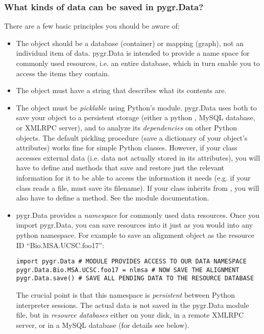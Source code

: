 \documentclass{howto}
\begin{document}
\subsubsection{What kinds of data can be saved in pygr.Data?}
There are a few basic principles you should be aware of:
\begin{itemize}
\item The object should be a database (container) or mapping (graph),
not an individual item of data.  pygr.Data is intended to provide
a name space for commonly used resources, i.e. an entire database,
which in turn enable you to access the items they contain.

\item The object must have a  string that describes
what its contents are.

\item The object must be {\em picklable} using Python's 
module.  pygr.Data uses  both to save your object to 
a persistent storage (either a python , MySQL database,
or XMLRPC server), and to analyze its {\em dependencies} on other
Python objects.  The default pickling procedure (save a dictionary of
your object's attributes) works fine for simple Python classes.
However, if your class accesses external data (i.e. data not actually
stored in its attributes), you will have to define 
and  methods that save and restore just the 
relevant information for it to be able to access the information
it needs (e.g. if your class reads a file,  must
save its filename).  If your class inherits from , you
will also have to define a  method.  See 
the  module documentation.

\item pygr.Data provides a {\em namespace} for commonly used data resources.
Once you import pygr.Data, you can save resources into it just as you would into
any python namespace.  For example to save an alignment object 
as the resource ID ``Bio.MSA.UCSC.foo17'':
\begin{verbatim}
import pygr.Data # MODULE PROVIDES ACCESS TO OUR DATA NAMESPACE
pygr.Data.Bio.MSA.UCSC.foo17 = nlmsa # NOW SAVE THE ALIGNMENT
pygr.Data.save() # SAVE ALL PENDING DATA TO THE RESOURCE DATABASE
\end{verbatim}
The crucial point is that this namespace is {\em persistent} between
Python interpreter sessions.  The actual data is not saved in the pygr.Data 
module file, but in {\em resource databases} either on your disk, in
a remote XMLRPC server, or in a MySQL database (for details see below).


\end{itemize}
\end{document}
